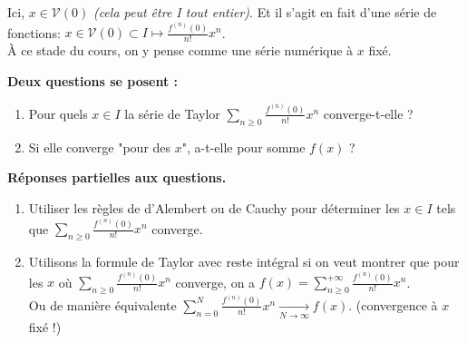\documentclass{article}
\begin{document}
Ici, $x \in \mathcal{V}(0)$ \textit{(cela peut être I tout entier)}. Et il s'agit en fait d'une série de fonctions: $x \in \mathcal{V}(0) \subset I \mapsto \frac{f^{(n)}(0)}{n!} x^n$.\\
À ce stade du cours, on y pense comme une série numérique à $x$ fixé.

\textbf{Deux questions se posent :}
\begin{enumerate}
    \item Pour quels $x \in I$ la série de Taylor $\sum_{n\geq0} \frac{f^{(n)}(0)}{n!} x^n$ converge-t-elle ?
    \item Si elle converge "pour des $x$", a-t-elle pour somme $f(x)$ ?
\end{enumerate}



\textbf{Réponses partielles aux questions.}
\begin{enumerate}
    \item Utiliser les règles de d'Alembert ou de Cauchy pour déterminer les $x \in I$ tels que $\sum_{n\geq0} \frac{f^{(n)}(0)}{n!} x^n$ converge.
    \item Utilisons la formule de Taylor avec reste intégral si on veut montrer que pour les $x$ où $\sum_{n\geq0} \frac{f^{(n)}(0)}{n!} x^n$ converge, on a $f(x) = \sum_{n\geq0}^{+\infty} \frac{f^{(n)}(0)}{n!} x^n$.\\
    Ou de manière équivalente $\sum_{n=0}^{N} \frac{f^{(n)}(0)}{n!} x^n \xrightarrow[N\to\infty]{} f(x)$. (convergence à $x$ fixé !)
\end{enumerate}

\end{document}
